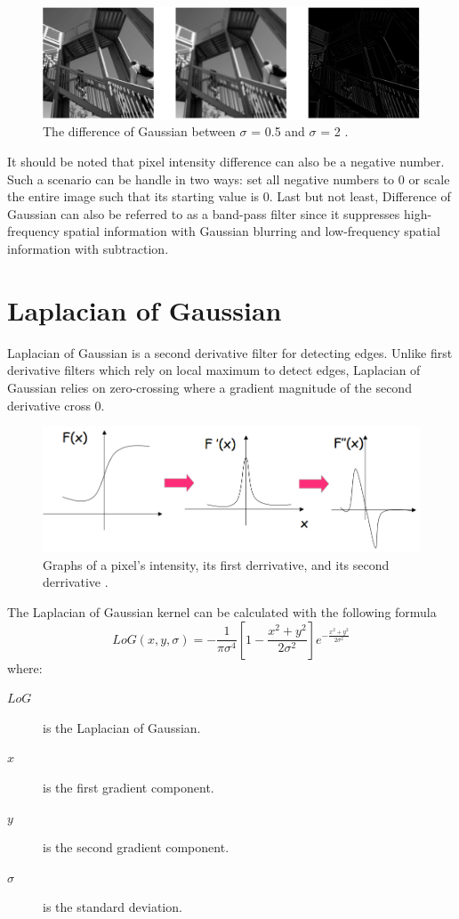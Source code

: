 \documentclass[conference]{IEEEtran}
\begin{document}
\begin{figure}[!htb]
    \centering
    \includegraphics[width=\linewidth,scale = 0.3]{DoG.png}
    \caption{The difference of Gaussian between $\sigma$ = 0.5 and $\sigma$ = 2 \cite{scipy-examples:2021}.}
\end{figure}

It should be noted that pixel intensity difference can also be a negative number. Such a scenario can be handle in two ways: set all negative numbers to 0 or scale the entire image such that its starting value is 0. Last but not least, Difference of Gaussian can also be referred to as a band-pass filter since it suppresses high-frequency spatial information with Gaussian blurring and low-frequency spatial information with subtraction.

\section{Laplacian of Gaussian}
Laplacian of Gaussian is a second derivative filter for detecting edges. Unlike first derivative filters which rely on local maximum to detect edges, Laplacian of Gaussian relies on zero-crossing where a gradient magnitude of the second derivative cross 0.
\begin{figure}[!htb]
    \centering
    \includegraphics[width=\linewidth,scale = 0.3]{LoG_derrivatives.PNG}
    \caption{Graphs of a pixel's intensity, its first derrivative, and its second derrivative \cite{collins:2007}.}
\end{figure}
The Laplacian of Gaussian kernel can be calculated with the following formula\cite{parikh:2020} \[LoG(x,y,\sigma)=-\frac{1}{\pi\sigma^4}\left[1-\frac{x^2+y^2}{2\sigma^2}\right]e^{-\frac{x^2+y^2}{2\sigma^2}}\] where:
\begin{description}
    \item[$LoG$] is the Laplacian of Gaussian.
    \item[$x$] is the first gradient component.
    \item[$y$] is the second gradient component.
    \item[$\sigma$] is the standard deviation.
\end{description}
\end{document}
